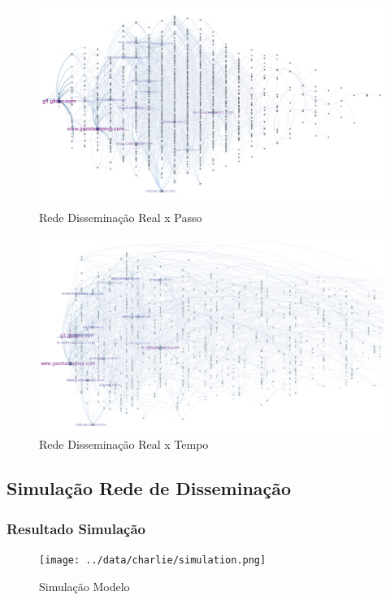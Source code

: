 \documentclass[a4paper,12pt]{article}
\begin{document}
\begin{figure}[ht]
 \centering
 \includegraphics[scale=0.7]{../results/a.png}
 \caption{Rede Disseminação Real x Passo}
\end{figure}


\begin{figure}[ht]
 \includegraphics[scale=0.8]{../results/t.png}
 \caption{Rede Disseminação Real x Tempo}
\end{figure}


\subsection{Simulação Rede de Disseminação}

\subsubsection{Resultado Simulação}
\begin{figure}[ht]
 \centering
 \texttt{[image: ../data/charlie/simulation.png]}
 \caption{Simulação Modelo}
\end{figure}
\end{document}
